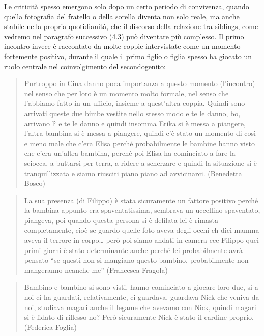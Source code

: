 \documentclass[12pt,oneside,svgnames]{memoir}
\newenvironment{quotationb}%
{\color{maincolor}\begin{leftbar}\begin{quotation}}%
{\end{quotation}\end{leftbar}\ignorespacesafterend}
\begin{document}
Le criticità spesso emergono solo dopo un certo periodo di convivenza,
quando quella fotografia del fratello o della sorella diventa non solo
reale, ma anche stabile nella propria quotidianità, che il discorso
della relazione tra siblings, come vedremo nel paragrafo successivo
(4.3) può diventare più complesso. Il primo incontro invece è raccontato
da molte coppie intervistate come un momento fortemente positivo,
durante il quale il primo figlio o figlia spesso ha giocato un ruolo
centrale nel coinvolgimento del secondogenito:

\begin{quotationb}
Purtroppo in Cina danno poca importanza a questo momento (l'incontro)
nel senso che per loro è un momento molto formale, nel senso che
l'abbiamo fatto in un ufficio, insieme a quest'altra coppia. Quindi sono
arrivati queste due bimbe vestite nello stesso modo e te le danno, bo,
arrivano lì e te le danno e quindi insomma Erika si è messa a piangere,
l'altra bambina si è messa a piangere, quindi c'è stato un momento di
così e meno male che c'era Elisa perché probabilmente le bambine hanno
visto che c'era un'altra bambina, perché poi Elisa ha cominciato a fare
la sciocca, a buttarsi per terra, a ridere a scherzare e quindi la
situazione si è tranquillizzata e siamo riusciti piano piano ad
avvicinarci. (Benedetta Bosco)
\end{quotationb}

\begin{quotationb}
La sua presenza (di Filippo) è stata sicuramente un fattore positivo
perché la bambina appunto era spaventatissima, sembrava un uccellino
spaventato, piangeva, poi quando questa persona si è defilata lei è
rimasta completamente, cioè se guardo quelle foto aveva degli occhi ch
dici mamma aveva il terrore in corpo\ldots{} però poi siamo andati in
camera eee Filippo quei primi giorni è stato determinante anche perché
lei probabilmente avrà pensato ``se questi non si mangiano questo
bambino, probabilmente non mangeranno neanche me'' (Francesca Fragola)
\end{quotationb}

\begin{quotationb}
Bambino e bambino si sono visti, hanno cominciato a giocare loro due, si
a noi ci ha guardati, relativamente, ci guardava, guardava Nick che
veniva da noi, studiava magari anche il legame che avevamo con Nick,
quindi magari si è fidato di riflesso no? Però sicuramente Nick è stato
il cardine proprio. (Federica Foglia)
\end{quotationb}
\end{document}
